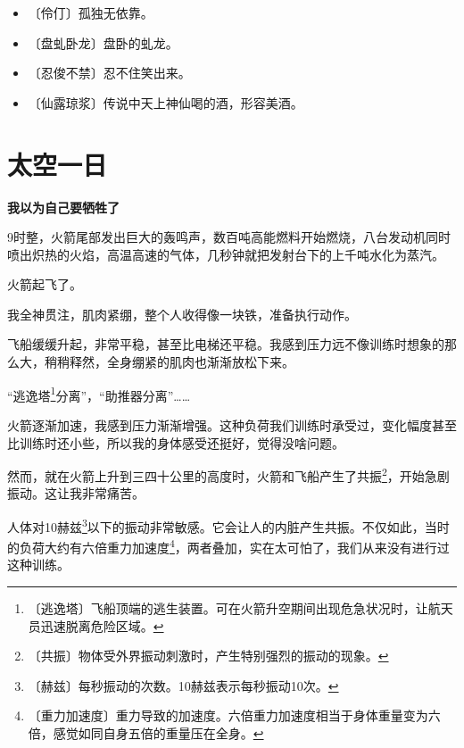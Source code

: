 \documentclass[12pt,UTF-8,openany]{ctexbook}
\begin{document}
\begin{itemize}
    \setlength\itemsep{-0.2em}
    \item 〔伶仃〕孤独无依靠。
    \item 〔盘虬卧龙〕盘卧的虬龙。
    \item 〔忍俊不禁〕忍不住笑出来。
    \item 〔仙露琼浆〕传说中天上神仙喝的酒，形容美酒。
\end{itemize}

\chapter{太空一日}

\begin{large}
    
    \begin{center}
    
    \begin{large}\textbf{我以为自己要牺牲了}\end{large}
    
    \end{center}
    
    9时整，火箭尾部发出巨大的轰鸣声，数百吨高能燃料开始燃烧，八台发动机同时喷出炽热的火焰，高温高速的气体，几秒钟就把发射台下的上千吨水化为蒸汽。
    
    火箭起飞了。
    
    我全神贯注，肌肉紧绷，整个人收得像一块铁，准备执行动作。
    
    飞船缓缓升起，非常平稳，甚至比电梯还平稳。我感到压力远不像训练时想象的那么大，稍稍释然，全身绷紧的肌肉也渐渐放松下来。
    
    “逃逸塔\footnote{〔逃逸塔〕飞船顶端的逃生装置。可在火箭升空期间出现危急状况时，让航天员迅速脱离危险区域。}分离”，“助推器分离”……
    
    火箭逐渐加速，我感到压力渐渐增强。这种负荷我们训练时承受过，变化幅度甚至比训练时还小些，所以我的身体感受还挺好，觉得没啥问题。
    
    然而，就在火箭上升到三四十公里的高度时，火箭和飞船产生了共振\footnote{〔共振〕物体受外界振动刺激时，产生特别强烈的振动的现象。}，开始急剧振动。这让我非常痛苦。
    
    人体对10赫兹\footnote{〔赫兹〕每秒振动的次数。10赫兹表示每秒振动10次。}以下的振动非常敏感。它会让人的内脏产生共振。不仅如此，当时的负荷大约有六倍重力加速度\footnote{〔重力加速度〕重力导致的加速度。六倍重力加速度相当于身体重量变为六倍，感觉如同自身五倍的重量压在全身。}，两者叠加，实在太可怕了，我们从来没有进行过这种训练。
    

\end{large}
\end{document}
